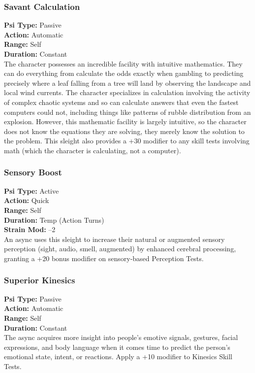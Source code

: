 \subsubsection{Savant Calculation}
\textbf{Psi Type:} Passive \\ 
\textbf{Action:} Automatic \\ 
\textbf{Range:} Self \\ 
\textbf{Duration:} Constant \\
The character possesses an incredible facility with
intuitive mathematics. They can do everything from
calculate the odds exactly when gambling to predicting
precisely where a leaf falling from a tree will land
by observing the landscape and local wind currents.
The character specializes in calculation involving the
activity of complex chaotic systems and so can calculate
answers that even the fastest computers could not,
including things like patterns of rubble distribution
from an explosion. However, this mathematic facility
is largely intuitive, so the character does not know the
equations they are solving, they merely know the solution
to the problem.
This sleight also provides a +30 modifier to any
skill tests involving math (which the character is calculating,
not a computer).

\subsubsection{Sensory Boost}
\textbf{Psi Type:} Active \\ 
\textbf{Action:} Quick \\ 
\textbf{Range:} Self \\ 
\textbf{Duration:} Temp (Action Turns) \\
\textbf{Strain Mod:} –2 \\
An async uses this sleight to increase their natural or
augmented sensory perception (sight, audio, smell,
augmented) by enhanced cerebral processing, granting
a +20 bonus modifier on sensory-based Perception
Tests.

\subsubsection{Superior Kinesics}
\textbf{Psi Type:} Passive \\ 
\textbf{Action:} Automatic \\ 
\textbf{Range:} Self \\ 
\textbf{Duration:} Constant \\
The async acquires more insight into people’s emotive
signals, gestures, facial expressions, and body
language when it comes time to predict the person’s
emotional state, intent, or reactions. Apply a +10
modifier to Kinesics Skill Tests.

